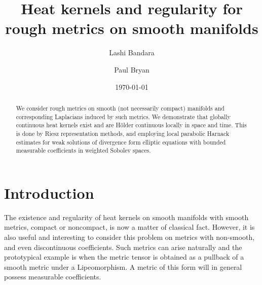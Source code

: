 \documentclass[a4paper, 12pt]{amsart}
\begin{document}
\title[Heat kernels and regularity for rough metrics]{Heat kernels and regularity for rough metrics on smooth manifolds}

\author{Lashi Bandara}
\author{Paul Bryan}

\address{Lashi Bandara, 
Institut für Mathematik,
Universität Potsdam, 
D-14476, Potsdam OT Golm, Germany
}

\address{Paul Bryan, 
Department of Mathematics
Macquarie University 
NSW, 2109, Australia
}



\curraddr{}
\email{}
\date{\today}

\dedicatory{}

\maketitle

\begin{abstract}
We consider rough metrics on smooth (not necessarily compact) manifolds and corresponding Laplacians
induced by such metrics. We demonstrate that globally continuous heat kernels exist and are Hölder continuous locally in space and time.
This is done by Riesz representation methods, and employing
local parabolic Harnack estimates for weak solutions of divergence form elliptic equations with bounded
measurable coefficients in weighted Sobolev spaces.
\end{abstract}

\setcounter{tocdepth}{1}
\tableofcontents

\parindent0cm
\setlength{\parskip}{\baselineskip}



\section{Introduction}
\label{sec:intro}
The existence and regularity of heat kernels on smooth manifolds with smooth metrics, compact or noncompact, 
is now a matter of classical fact. 
However, it is also useful and interesting to consider this problem on
metrics with non-smooth, and even discontinuous coefficients. 
Such metrics can arise naturally and the prototypical example 
is when the metric tensor is obtained as a pullback of a smooth metric under a 
Lipeomorphism. A metric of this form will in general possess measurable
coefficients.
\end{document}
